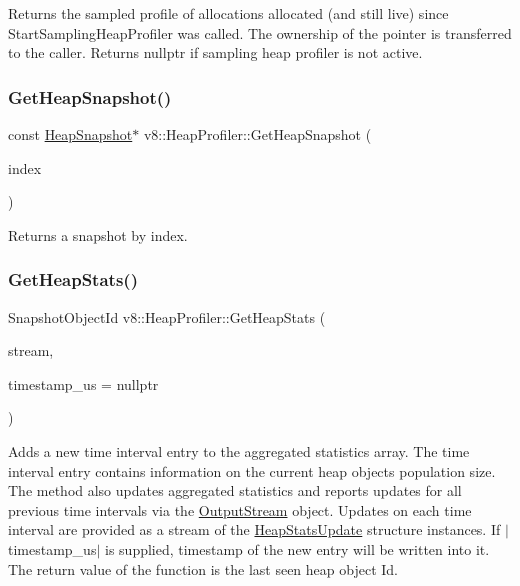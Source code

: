 Returns the sampled profile of allocations allocated (and still live) since Start\+Sampling\+Heap\+Profiler was called. The ownership of the pointer is transferred to the caller. Returns nullptr if sampling heap profiler is not active. \mbox{\label{classv8_1_1HeapProfiler_af9093f6ca6e5558315f354c7ccb55484}} 
\subsubsection{\texorpdfstring{Get\+Heap\+Snapshot()}{GetHeapSnapshot()}}
{\footnotesize\ttfamily const \mbox{\hyperlink{classv8_1_1HeapSnapshot}{Heap\+Snapshot}}$\ast$ v8\+::\+Heap\+Profiler\+::\+Get\+Heap\+Snapshot (\begin{DoxyParamCaption}\item[{int}]{index }\end{DoxyParamCaption})}

Returns a snapshot by index. \mbox{\label{classv8_1_1HeapProfiler_add093717acd067daeddb7ef5fc8b191a}} 
\subsubsection{\texorpdfstring{Get\+Heap\+Stats()}{GetHeapStats()}}
{\footnotesize\ttfamily Snapshot\+Object\+Id v8\+::\+Heap\+Profiler\+::\+Get\+Heap\+Stats (\begin{DoxyParamCaption}\item[{\mbox{\hyperlink{classv8_1_1OutputStream}{Output\+Stream}} $\ast$}]{stream,  }\item[{int64\+\_\+t $\ast$}]{timestamp\+\_\+us = {\ttfamily nullptr} }\end{DoxyParamCaption})}

Adds a new time interval entry to the aggregated statistics array. The time interval entry contains information on the current heap objects population size. The method also updates aggregated statistics and reports updates for all previous time intervals via the \mbox{\hyperlink{classv8_1_1OutputStream}{Output\+Stream}} object. Updates on each time interval are provided as a stream of the \mbox{\hyperlink{structv8_1_1HeapStatsUpdate}{Heap\+Stats\+Update}} structure instances. If $\vert$timestamp\+\_\+us$\vert$ is supplied, timestamp of the new entry will be written into it. The return value of the function is the last seen heap object Id.

